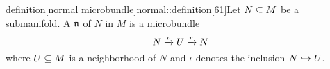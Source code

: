 \begin{mystatement}{definition}[normal microbundle]{normal::definition}[61]Let $N \subseteq{} M$ be a submanifold. A  $\mathfrak{n}$ of $N$ in $M$ is a microbundle \[ N \xrightarrow{\iota} U \xrightarrow{r} N{} \] where $U \subseteq{} M$ is a neighborhood of $N$ and $\iota$ denotes the inclusion $N \hookrightarrow{} U$.
\end{mystatement}